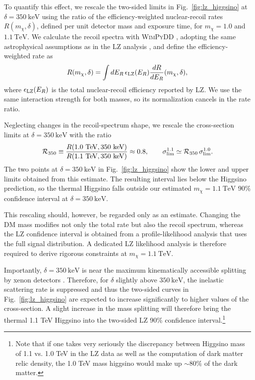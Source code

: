 \documentclass[
aps,
prl,
reprint,
superscriptaddress,
nofootinbib,
nobibnotes
]{revtex4-2}
\begin{document}
To quantify this effect, we rescale the two-sided limits in Fig.~\ref{fig:lz_higgsino} at $\delta=350~\mathrm{keV}$ using the ratio of the efficiency-weighted nuclear-recoil rates $R(m_\chi,\delta)$, defined per unit detector mass and exposure time, for $m_\chi=1.0$ and $1.1~\mathrm{TeV}$. We calculate the recoil spectra with \textsc{WimPyDD} \cite{Jeong:2021bpl}, adopting the same astrophysical assumptions as in the LZ analysis
\cite{Baxter:2021pqo}, and define the
efficiency-weighted rate as
\begin{equation}
    R(m_\chi,\delta)
    =
    \int dE_R\,
    \epsilon_{\rm LZ}(E_R)
    \frac{dR}{dE_R}(m_\chi,\delta),
    \label{eq:recoil_rate}
\end{equation}
where $\epsilon_{\rm LZ}(E_R)$ is the total nuclear-recoil efficiency reported by LZ. We use the same interaction strength for both masses, so its normalization cancels in the rate ratio.

Neglecting changes in the recoil-spectrum shape, we rescale the cross-section limits at $\delta=350\ \mathrm{keV}$ with the ratio
\begin{equation}
    \mathcal R_{350}
    \equiv
    \frac{R(1.0~\mathrm{TeV},350~\mathrm{keV})}
         {R(1.1~\mathrm{TeV},350~\mathrm{keV})}
    \approx0.8,
    \qquad
    \sigma_{\rm lim}^{1.1}
    \simeq
    \mathcal R_{350}\,
    \sigma_{\rm lim}^{1.0}.
    \label{eq:mass_rescaling}
\end{equation}
The two points at $\delta=350~\mathrm{keV}$ in
Fig.~\ref{fig:lz_higgsino} show the lower and upper limits obtained from
this estimate. The resulting interval lies below the Higgsino prediction,
so the thermal Higgsino falls outside our estimated
$m_\chi=1.1~\mathrm{TeV}$ 90\% confidence interval at
$\delta=350~\mathrm{keV}$.

This rescaling should, however, be regarded only as an estimate.
Changing the DM mass modifies not only the total rate but also the recoil spectrum, whereas the LZ confidence interval is obtained from a profile-likelihood analysis that uses the full signal distribution.
A dedicated LZ likelihood analysis is therefore required to derive rigorous constraints at $m_\chi=1.1~\mathrm{TeV}$.

Importantly, $\delta=350~\mathrm{keV}$ is near the maximum kinematically accessible splitting by xenon detectors \cite{Tucker-Smith:2001myb,Barello:2014uda}. 
Therefore, for $\delta$ slightly above $350~\mathrm{keV}$, the inelastic scattering rate is suppressed and thus the two-sided curves in Fig.~\ref{fig:lz_higgsino}
are expected to increase significantly to higher values of the cross-section. 
A slight increase in the mass splitting will therefore
bring the thermal 1.1 TeV Higgsino into the two-sided LZ 90\% confidence interval.\footnote{Note that if one takes very seriously the discrepancy between Higgsino mass of 1.1 vs. 1.0 TeV in the LZ data as well as the computation of dark matter relic density, the 1.0 TeV mass higgsino would make up $\sim 80\%$ of the dark matter.}
\end{document}
